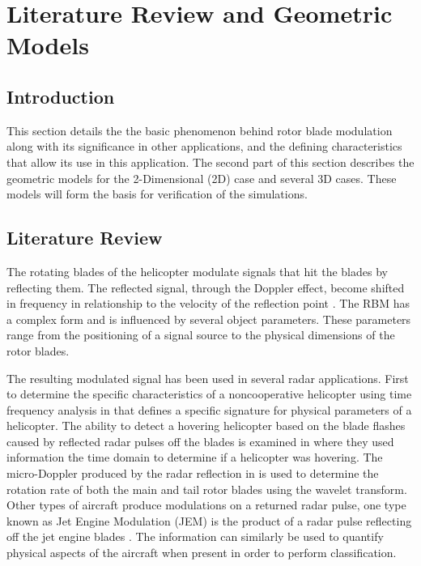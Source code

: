 \chapter{Literature Review and Geometric Models} \label{ch:background}

\section{Introduction}
This section details the the basic phenomenon behind rotor blade modulation along with its significance in other applications, and the defining characteristics that allow its use in this application. The second part of this section describes the geometric models for the 2-Dimensional (2D) case and several 3D cases. These models will form the basis for verification of the simulations.

\section{Literature Review}
The rotating blades of the helicopter modulate signals that hit the blades by reflecting them. The reflected signal, through the Doppler effect, become shifted in frequency in relationship to the velocity of the reflection point \cite{YiminZhang2000}. The RBM has a complex form and is influenced by several object parameters. These parameters range from the positioning of a signal source to the physical dimensions of the rotor blades. 

The resulting modulated signal has been used in several radar applications. First to determine the specific characteristics of a noncooperative helicopter using time frequency analysis in \cite{Bullard1991} that defines a specific signature for physical parameters of a helicopter. The ability to detect a hovering helicopter based on the blade flashes caused by reflected radar pulses off the blades is examined in \cite{Misiurewicz1997} where they used information the time domain to determine if a helicopter was hovering. The micro-Doppler produced by the radar reflection in \cite{Thayaparan2007} is used to determine the rotation rate of both the main and tail rotor blades using the wavelet transform. Other types of aircraft produce modulations on a returned radar pulse, one type known as Jet Engine Modulation (JEM) is the product of a radar pulse reflecting off the jet engine blades \cite{NavalAirSystemsCommand1999}. The information can similarly be used to quantify physical aspects of the aircraft when present in order to perform classification.

